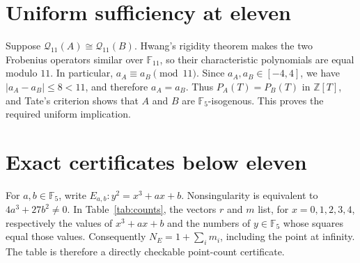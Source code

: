 \documentclass[11pt]{article}
\newcommand{\F}{\mathbb F}
\newcommand{\Q}{\mathcal Q}
\begin{document}
\section{Uniform sufficiency at eleven}

Suppose $\Q_{11}(A)\cong\Q_{11}(B)$.  Hwang's rigidity theorem makes the
two Frobenius operators similar over $\F_{11}$, so their characteristic
polynomials are equal modulo $11$.  In particular,
$a_A\equiv a_B\pmod {11}$.  Since $a_A,a_B\in[-4,4]$, we have
$|a_A-a_B|\le8<11$, and therefore $a_A=a_B$.  Thus
$P_A(T)=P_B(T)$ in $\mathbb Z[T]$, and Tate's criterion shows that $A$ and
$B$ are $\F_5$-isogenous.  This proves the required uniform implication.

\section{Exact certificates below eleven}

For $a,b\in\F_5$, write $E_{a,b}:y^2=x^3+ax+b$.  Nonsingularity is
equivalent to $4a^3+27b^2\ne0$.  In Table~\ref{tab:counts}, the vectors
$r$ and $m$ list, for $x=0,1,2,3,4$, respectively the values of
$x^3+ax+b$ and the numbers of $y\in\F_5$ whose squares equal those values.
Consequently $N_E=1+\sum_i m_i$, including the point at infinity.  The
table is therefore a directly checkable point-count certificate.

\begin{table}[ht]
\centering
\caption{Exact curve and Frobenius data over $\F_5$.  The column $d$ is
$4a^3+27b^2$ modulo $5$.}
\label{tab:counts}
\end{table}
\end{document}
